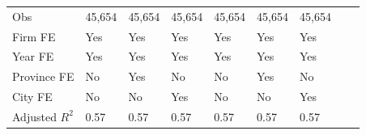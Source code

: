 \begin{table}[htbp]
\begin{tabularx}{\textwidth}{lYYYYYYYY@{}}
Obs             &   45,654         &   45,654         &   45,654         &   45,654         &   45,654         &   45,654         \\
Firm FE         &      Yes         &      Yes         &      Yes         &      Yes         &      Yes         &      Yes         \\
Year FE         &      Yes         &      Yes         &      Yes         &      Yes         &      Yes         &      Yes         \\
Province FE     &       No         &      Yes         &       No         &       No         &      Yes         &       No         \\
City FE         &       No         &       No         &      Yes         &       No         &       No         &      Yes         \\
Adjusted $ R^2$ &     0.57         &     0.57         &     0.57         &     0.57         &     0.57         &     0.57         \\
\bottomrule
\end{tabularx}
\end{table}
